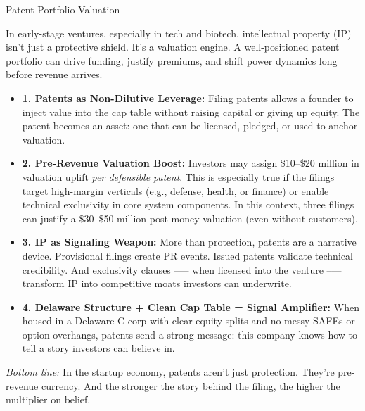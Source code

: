 \begin{TechnicalSidebar}{Patent Portfolio Valuation}

  In early-stage ventures, especially in tech and biotech, intellectual property (IP) isn’t just a protective shield. 
  It’s a valuation engine. A well-positioned patent portfolio can drive funding, justify premiums, and shift power 
  dynamics long before revenue arrives.
  
  \medskip

  \begin{itemize}
  
    \item \textbf{1. Patents as Non-Dilutive Leverage:}  
    Filing patents allows a founder to inject value into the cap table without raising capital or giving up equity. 
    The patent becomes an asset: one that can be licensed, pledged, or used to anchor valuation.
    
    \item \textbf{2. Pre-Revenue Valuation Boost:}  
    Investors may assign \$10–\$20 million in valuation uplift \textit{per defensible patent}. This is especially true 
    if the filings target high-margin verticals (e.g., defense, health, or finance) or enable technical exclusivity 
    in core system components.  In this context, three filings can justify a \$30–\$50 million post-money 
    valuation (even without customers).
    
    \item \textbf{3. IP as Signaling Weapon:}  
    More than protection, patents are a narrative device. Provisional filings create PR events. Issued patents 
    validate technical credibility. And exclusivity clauses --— when licensed into the venture --— transform IP 
    into competitive moats investors can underwrite.
    
    \item \textbf{4. Delaware Structure + Clean Cap Table = Signal Amplifier:}  
    When housed in a Delaware C-corp with clear equity splits and no messy SAFEs or option overhangs, patents 
    send a strong message: this company knows how to tell a story investors can believe in.

  \end{itemize}

  \medskip
  
  \textit{Bottom line:}  
  In the startup economy, patents aren’t just protection. They’re pre-revenue currency.  
  And the stronger the story behind the filing, the higher the multiplier on belief.
  
\end{TechnicalSidebar}





